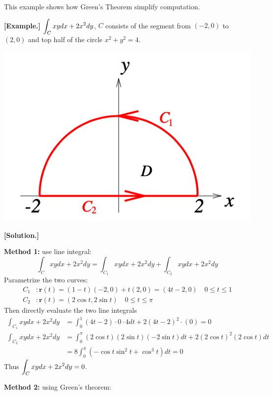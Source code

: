 \documentclass[11pt, a4paper]{MATH2023}
\newcommand{\eg}{\textbf{[Example.] }}
\newcommand{\sol}{\textbf{[Solution.] }}
\begin{document}
\begin{spacing}{1.3}
    
    \newpage
    {\blue This example shows how Green's Theorem simplify computation.}

    \eg $\displaystyle \int_{C} x y d x+2 x^{2} d y$, $C$ consists of the segment from $(-2,0)$ to $(2,0)$ and top half of the circle
    $x^2+y^2=4$.
    \begin{center}
        \includegraphics[scale=0.45]{images/Ch16-ex4.2.png}
    \end{center}
    
    \sol 
    
    {\bf Method 1:} use line integral: 
    $$ \int_{C} x y d x+2 x^{2} d y=\int_{C_{1}} x y d x+2 x^{2} d y+\int_{C_{2}} x y d x+2 x^{2} d y$$
    Parametrize the two curves:
    \begin{align*}
        C_{1} &: \mathbf{r}(t)=(1-t)(-2,0)+t(2,0)=(4 t-2,0) \quad 0 \leqslant t \leqslant 1 \\
        C_{2} &: \mathbf{r}(t)=(2 \cos t, 2 \sin t) \quad 0 \leqslant t \leqslant \pi
    \end{align*}
    Then directly evaluate the two line integrals
    \begin{align*}
        \int_{C_{1}} x y d x+2 x^{2} d y &=\int_{0}^{1}(4 t-2) \cdot 0 \cdot 4 d t+2(4 t-2)^{2} \cdot(0)=0 \\
        \int_{C_{2}} x y d x+2 x^{2} d y &=\int_{0}^{\pi}(2 \cos t)(2 \sin t)(-2 \sin t) d t+2(2 \cos t)^{2}(2 \cos t) d t \\
        &=8 \int_{0}^{\pi}\left(-\cos t \sin ^{2} t+\cos ^{3} t\right) d t=0
    \end{align*}
    Thus $\displaystyle \int_{C} x y d x+2 x^{2} d y=0$.
    
    \vspace{0.5in}
    {\bf Method 2: } using Green's theorem:


\end{spacing}
\end{document}
